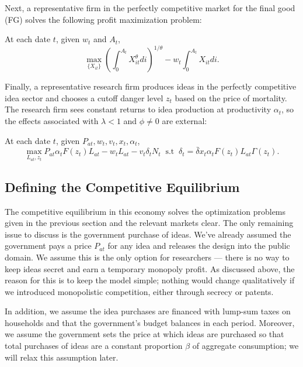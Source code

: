 \documentclass[12pt,twoside]{article}
\newcommand{\problem}[2]{\hspace{.1in} {{\color{ChadBlue}{\bf #1:} #2}}}
\begin{document}
\vspace{-.1in} Next, a representative firm in the perfectly competitive
market for the final good (FG) solves the following profit maximization
problem:\vspace{.1in}

\hypertarget{FG}{}
\problem{FG Problem}{At each date $t$, given $w_t$ and $A_t$, 
\[ \max_{\{X_{it}\}} \left( \int_0 ^{A_t} X_{it} ^\theta di \right)^{1/\theta} - w_t
\int_0 ^{A_t} X_{it} di. \] }

\vspace{-.1in}
Finally, a representative research firm produces ideas in the perfectly
competitive idea sector and chooses a cutoff danger level $z_t$ based on
the price of mortality.  The research firm sees constant returns to idea
production at productivity $\alpha_t$, so the effects associated with
$\lambda<1$ and $\phi \neq 0$ are external:\vspace{.1in}

\hypertarget{RD}{}
\problem{R\&D Problem}{At each date $t$, given $P_{at}, w_t, v_t, x_t, \alpha_t$, 
\[ \max_{L_{at},z_t} P_{at} \alpha_t F(z_t) L_{at} - w_t L_{at} - v_t
\delta_t N_t  \ \mbox{ s.t } \ \delta_t = \bar{\delta} x_t \alpha_t
F(z_t) L_{at} \Gamma(z_t).  \]}

\vspace{-.2in}
\subsection{Defining the Competitive Equilibrium}

The competitive equilibrium in this economy solves the optimization
problems given in the previous section and the relevant markets clear.
The only remaining issue to discuss is the government purchase of ideas.
We've already assumed the government pays a price $P_{at}$ for any idea
and releases the design into the public domain. We assume this is the
only option for researchers --- there is no way to keep ideas secret and
earn a temporary monopoly profit. As discussed above, the reason for
this is to keep the model simple; nothing would change qualitatively if
we introduced monopolistic competition, either through secrecy or
patents.

In addition, we assume the idea purchases are financed with lump-sum
taxes on households and that the government's budget balances in each
period. Moreover, we assume the government sets the price at which ideas
are purchased so that total purchases of ideas are a constant proportion
$\beta$ of aggregate consumption; we will relax this assumption later.
\end{document}
